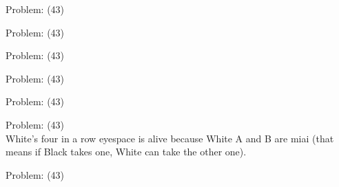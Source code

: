 \documentclass[11pt]{article}
\begin{document}
\begin{minipage}[t]{0.5\textwidth}
  {\centering
  
  Problem: (43)\\
  
  }
\end{minipage}
\begin{minipage}[t]{0.5\textwidth}
  {\centering
  
  Problem: (43)\\
  
  }
\end{minipage}
\begin{minipage}[t]{0.5\textwidth}
  {\centering
  
  Problem: (43)\\
  
  }
\end{minipage}
\begin{minipage}[t]{0.5\textwidth}
  {\centering
  
  Problem: (43)\\
  
  }
\end{minipage}
\begin{minipage}[t]{0.5\textwidth}
  {\centering
  
  Problem: (43)\\
  
  }
\end{minipage}
\begin{minipage}[t]{0.5\textwidth}
  {\centering
  
  Problem: (43)\\
  White's four in a row eyespace is alive because White A and B are miai (that means if Black takes one, White can take the other one).\\
  }
\end{minipage}
\begin{minipage}[t]{0.5\textwidth}
  {\centering
  
  Problem: (43)\\
  
  }
\end{minipage}
\end{document}
